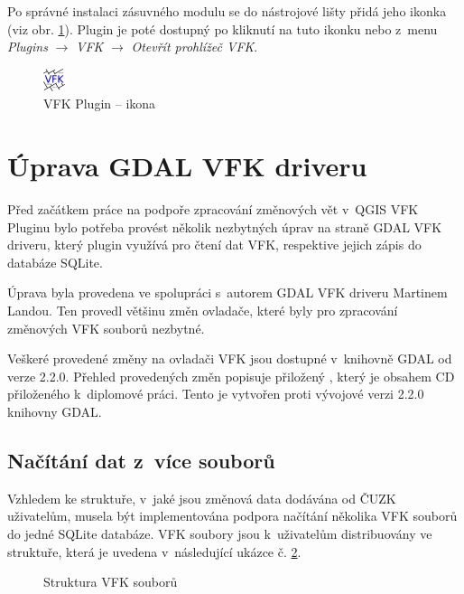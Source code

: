 \documentclass[a4paper,12pt,oneside]{book}
\begin{document}
Po správné instalaci zásuvného modulu se do nástrojové lišty přidá
jeho ikonka (viz obr. \ref{l_plugin_ikona}). Plugin je poté dostupný
po kliknutí na tuto ikonku nebo z~menu \textit{Plugins} $\rightarrow$
\textit{VFK} $\rightarrow$ \textit{Otevřít prohlížeč VFK}.

\begin{figure}[H]
\centering
\includegraphics[scale=0.9]{images/vfkPluginIcon.png}
\caption[VFK Plugin -- ikona]{VFK Plugin -- ikona}
\label{l_plugin_ikona}
\end{figure}


\section{Úprava GDAL VFK driveru}
\label{l_uprava_gdal}
Před začátkem práce na podpoře zpracování změnových vět v~QGIS VFK
Pluginu bylo potřeba provést několik nezbytných úprav na straně GDAL
VFK driveru, který plugin využívá pro čtení dat VFK, respektive jejich
zápis do databáze SQLite.

Úprava byla provedena ve spolupráci s~autorem GDAL VFK driveru
Martinem Landou. Ten provedl většinu změn ovladače, které byly pro
zpracování změnových VFK souborů nezbytné.

Veškeré provedené změny na ovladači VFK jsou dostupné v~knihovně GDAL
od verze 2.2.0. Přehled provedených změn popisuje přiložený ,
který je obsahem CD přiloženého k~diplomové práci. Tento  je
vytvořen proti vývojové verzi 2.2.0 knihovny GDAL.

\subsection{Načítání dat z~více souborů}
Vzhledem ke struktuře, v~jaké jsou změnová data dodávána od ČUZK
uživatelům, musela být implementována podpora načítání několika VFK
souborů do jedné SQLite databáze. VFK soubory jsou k~uživatelům
distribuovány ve struktuře, která je uvedena v~následující ukázce
č. \ref{l_struktura_sireni_vfk}.

\begin{figure}[htb]
\centering
\begin{minipage}{0.9\textwidth}
\end{minipage}
\caption{Struktura VFK souborů}
\label{l_struktura_sireni_vfk}
\end{figure}
\end{document}
